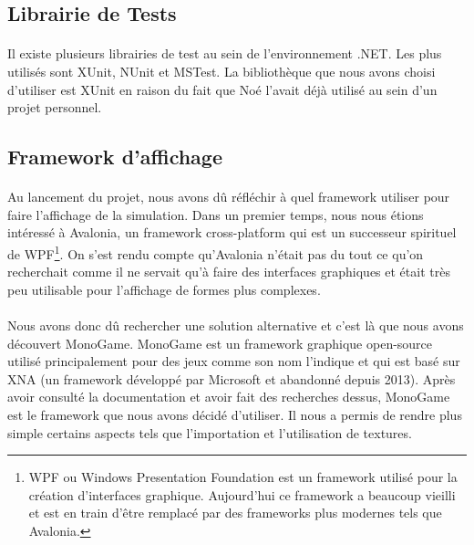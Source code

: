 \documentclass{EPUProjetDi}
\begin{document}
\subsection{Librairie de Tests}

\paragraph{}
Il existe plusieurs librairies de test au sein de l'environnement .NET. Les plus utilisés sont XUnit, NUnit et MSTest.
La bibliothèque que nous avons choisi d'utiliser est XUnit en raison du fait que Noé l'avait déjà utilisé au sein d'un projet personnel.

\subsection{Framework d'affichage}

\paragraph{}
Au lancement du projet, nous avons dû réfléchir à quel framework utiliser pour faire l'affichage de la simulation.
Dans un premier temps, nous nous étions intéressé à Avalonia, un framework cross-platform qui est un successeur spirituel de WPF\footnote{WPF ou Windows Presentation Foundation est un framework 
utilisé pour la création d'interfaces graphique. Aujourd'hui ce framework a beaucoup vieilli et est en train d'être remplacé par des frameworks plus modernes tels que Avalonia.}.
On s'est rendu compte qu'Avalonia n'était pas du tout ce qu'on recherchait comme il ne servait qu'à faire des interfaces graphiques et était très peu utilisable pour l'affichage de formes plus complexes.

\paragraph{}
Nous avons donc dû rechercher une solution alternative et c'est là que nous avons découvert MonoGame. 
MonoGame est un framework graphique open-source utilisé principalement pour des jeux comme son nom l'indique et qui est basé
sur XNA (un framework développé par Microsoft et abandonné depuis 2013). 
Après avoir consulté la documentation et avoir fait des recherches dessus, MonoGame est le framework que nous avons décidé d'utiliser. 
Il nous a permis de rendre plus simple certains aspects tels que l'importation et l'utilisation de textures.
\end{document}
